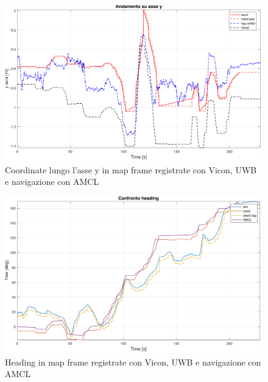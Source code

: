 \begin{figure}[] 
	\centering    
	\includegraphics[height=.3\textheight]{grafici_stanzavolo_vicon/figure6.pdf}
	\caption{Coordinate lungo l'asse y in map frame registrate con Vicon, UWB e navigazione con AMCL}
	\label{fig: asse_y_vicon_charlie}
\end{figure}

\begin{figure}[] 
	\centering    
	\includegraphics[height=.3\textheight]{grafici_stanzavolo_vicon/figure2.pdf}
	\caption{Heading in map frame registrate con Vicon, UWB e navigazione con AMCL}
	\label{fig: heading_vicon_charlie}
\end{figure}

